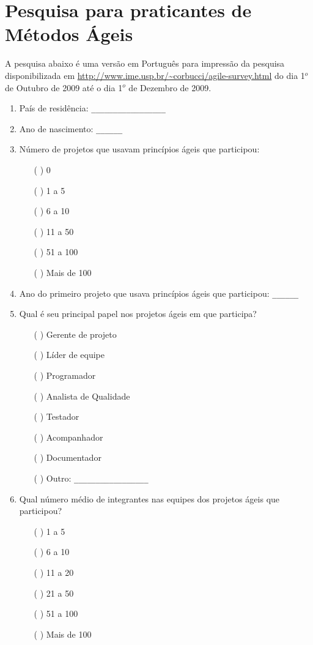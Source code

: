\chapter{Pesquisa para praticantes de Métodos Ágeis}
\label{ape:MA}

\singlespacing

A pesquisa abaixo é uma versão em Português para impressão da pesquisa
disponibilizada em
\url{http://www.ime.usp.br/~corbucci/agile-survey.html} do dia 1$^o$ de
Outubro de 2009 até o dia 1$^o$ de Dezembro de 2009.

\begin{enumerate}
\item País de residência: \verb=_________________=

\item Ano de nascimento: \verb=______=

\item Número de projetos que usavam princípios ágeis que participou:
  \begin{itemize}
  \item[( )] 0
  \item[( )] 1 a 5
  \item[( )] 6 a 10
  \item[( )] 11 a 50
  \item[( )] 51 a 100
  \item[( )] Mais de 100
  \end{itemize}

\item Ano do primeiro projeto que usava princípios ágeis que
  participou: \verb=______=

\item Qual é seu principal papel nos projetos ágeis em que participa?
  \begin{itemize}
  \item[( )] Gerente de projeto
  \item[( )] Líder de equipe
  \item[( )] Programador
  \item[( )] Analista de Qualidade
  \item[( )] Testador
  \item[( )] Acompanhador
  \item[( )] Documentador
  \item[( )] Outro: \verb=_________________=
  \end{itemize}

\item Qual número médio de integrantes nas equipes dos projetos ágeis
  que participou?
  \begin{itemize}
  \item[( )] 1 a 5
  \item[( )] 6 a 10
  \item[( )] 11 a 20
  \item[( )] 21 a 50
  \item[( )] 51 a 100
  \item[( )] Mais de 100
  \end{itemize}


\end{enumerate}
